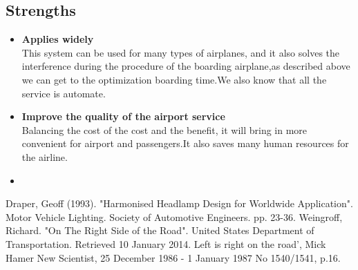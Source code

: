 \subsection{Strengths}
\begin{itemize}
\item \textbf{Applies widely}\\
This  system can be used for many types of airplanes, and it also
solves the interference during  the procedure of the boarding
airplane,as described above we can get to the  optimization
boarding time.We also know that all the service is automate.
\item \textbf{Improve the quality of the airport service}\\
Balancing the cost of the cost and the benefit, it will bring in
more convenient  for airport and passengers.It also saves many
human resources for the airline. \item \textbf{}
\end{itemize}




\begin{thebibliography}{99}
 Draper, Geoff (1993). "Harmonised 
Headlamp Design for Worldwide Application". Motor Vehicle 
Lighting. Society of Automotive Engineers. pp. 23-36.
 Weingroff, Richard. "On The 
Right Side of the Road". United States Department of 
Transportation. Retrieved 10 January 2014.
 Left is right on the road', Mick Hamer 
New Scientist, 25 December 1986 - 1 January 1987 No 1540/1541, 
p.16.
\end{thebibliography}

